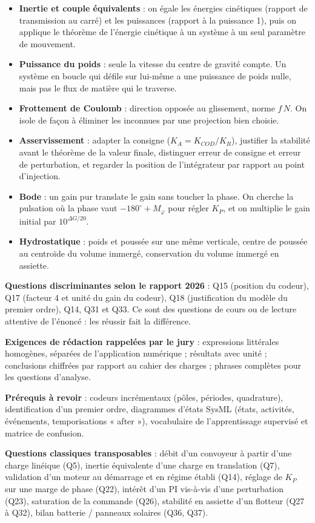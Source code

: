 \documentclass[11pt,a4paper]{article}
\providecommand{\tightlist}{\setlength{\itemsep}{0pt}\setlength{\parskip}{0pt}}
\begin{document}
\begin{itemize}
\tightlist
\item
  \textbf{Inertie et couple équivalents} : on égale les énergies cinétiques (rapport de transmission au carré) et les puissances (rapport à la puissance 1), puis on applique le théorème de l'énergie cinétique à un système à un seul paramètre de mouvement.
\item
  \textbf{Puissance du poids} : seule la vitesse du centre de gravité compte. Un système en boucle qui défile sur lui-même a une puissance de poids nulle, mais pas le flux de matière qui le traverse.
\item
  \textbf{Frottement de Coulomb} : direction opposée au glissement, norme \(f\,N\). On isole de façon à éliminer les inconnues par une projection bien choisie.
\item
  \textbf{Asservissement} : adapter la consigne (\(K_A=K_{COD}/K_R\)), justifier la stabilité avant le théorème de la valeur finale, distinguer erreur de consigne et erreur de perturbation, et regarder la position de l'intégrateur par rapport au point d'injection.
\item
  \textbf{Bode} : un gain pur translate le gain sans toucher la phase. On cherche la pulsation où la phase vaut \(-180^\circ+M_\varphi\) pour régler \(K_P\), et on multiplie le gain initial par \(10^{\Delta G/20}\).
\item
  \textbf{Hydrostatique} : poids et poussée sur une même verticale, centre de poussée au centroïde du volume immergé, conservation du volume immergé en assiette.
\end{itemize}

\textbf{Questions discriminantes selon le rapport 2026} : Q15 (position du codeur), Q17 (facteur 4 et unité du gain du codeur), Q18 (justification du modèle du premier ordre), Q14, Q31 et Q33. Ce sont des questions de cours ou de lecture attentive de l'énoncé : les réussir fait la différence.

\textbf{Exigences de rédaction rappelées par le jury} : expressions littérales homogènes, séparées de l'application numérique ; résultats avec unité ; conclusions chiffrées par rapport au cahier des charges ; phrases complètes pour les questions d'analyse.

\textbf{Prérequis à revoir} : codeurs incrémentaux (pôles, périodes, quadrature), identification d'un premier ordre, diagrammes d'états SysML (états, activités, événements, temporisations « after »), vocabulaire de l'apprentissage supervisé et matrice de confusion.

\textbf{Questions classiques transposables} : débit d'un convoyeur à partir d'une charge linéique (Q5), inertie équivalente d'une charge en translation (Q7), validation d'un moteur au démarrage et en régime établi (Q14), réglage de \(K_P\) sur une marge de phase (Q22), intérêt d'un PI vis-à-vis d'une perturbation (Q23), saturation de la commande (Q26), stabilité en assiette d'un flotteur (Q27 à Q32), bilan batterie / panneaux solaires (Q36, Q37).
\end{document}
